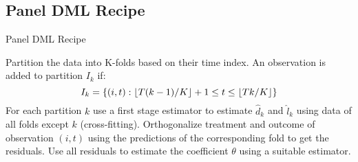 \subsection*{Panel DML Recipe}
\begin{algorithm}
    \caption{Panel DML Recipe}
    \begin{algorithmic}[1]
        \State Partition the data into K-folds based on their time index. An observation is added to partition $I_k$ if: 
                $$I_k=\left\{(i, t) : \lfloor T(k-1)/K\rfloor+1 \leq t \leq \lfloor Tk/K\rfloor\right\}$$ 
        \State For each partition $k$ use a first stage estimator to estimate $\hat{d}_k$ and $\hat{l}_k$ using data of all folds except $k$ (cross-fitting). 
        \State Orthogonalize treatment and outcome of observation $(i, t)$ using the predictions of the corresponding fold to get the residuals. 
        \State Use all residuals to estimate the coefficient $\theta$ using a suitable estimator.  
    \end{algorithmic}
\end{algorithm}
